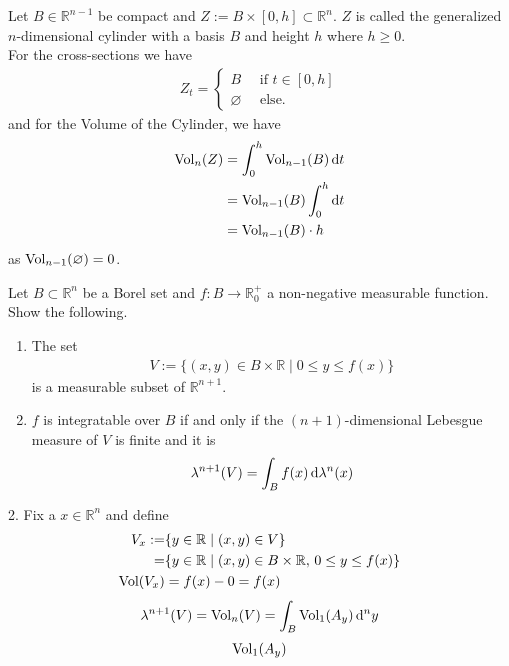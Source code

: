 %
\begin{example}
    Let \(B \in \mathbb{R}^{n-1}\) be compact and \(Z := B \times [0, h] \subset \mathbb{R}^n\). \(Z\) is called the generalized \(n\)-dimensional cylinder with a basis \(B\) and height \(h\) where \(h \geq 0\). \\
    For the cross-sections we have
    \begin{align}
        Z_t = \begin{cases}
            B \quad \text{ if } t \in [0, h] \\
            \varnothing \quad\text{ else.}
        \end{cases}
    \end{align}
    and for the Volume of the Cylinder, we have
    \begin{align}
        \text{Vol}_n(Z) &= \int_0^h \text{Vol}_{n-1}(B) \mathop{}\!\mathrm{d} t \\
        &= \text{Vol}_{n-1}(B) \int_0^h \mathop{}\!\mathrm{d} t \\
        &= \text{Vol}_{n-1}(B) \cdot h
    \end{align}
    as \(\text{Vol}_{n-1} (\varnothing) = 0\).
\end{example}
%
\begin{question}
    Let \(B \subset \mathbb{R}^n\) be a Borel set and \(f: B \rightarrow \mathbb{R}^+_0\) a non-negative measurable function. Show the following.
    \begin{enumerate}
        \item The set
        \begin{align}
            V := \{(x, y) \in B \times \mathbb{R} \mid 0 \leq y \leq f(x)\}
        \end{align}
        is a measurable subset of \(\mathbb{R}^{n + 1}\).
        \item \(f\) is integratable over \(B\) if and only if the \((n + 1)\)-dimensional Lebesgue measure of \(V\) is finite and it is
        \begin{align}
            \lambda^{n + 1} (V) = \int_B f(x) \mathop{}\!\mathrm{d} \lambda^n (x)
        \end{align}
    \end{enumerate}
\end{question}
\begin{solution}
    2. Fix a \(x \in \mathbb{R}^n\) and define
    \begin{align}
        V_x :=& \{y \in \mathbb{R} \mid (x, y) \in V\} \\
        =& \{y \in \mathbb{R} \mid (x, y) \in B \times \mathbb{R}, \, 0 \leq y \leq f(x)\} \\
        \text{Vol} (V_x) &= f(x) - 0 = f(x) 
    \end{align}
    \begin{align}
        \lambda^{n+1} (V) = \text{Vol}_n(V) = \int_B \text{Vol}_1(A_y) \mathop{}\!\mathrm{d}^n y
    \end{align}
    \begin{align}
        \text{Vol}_1(A_y)
    \end{align}
\end{solution}